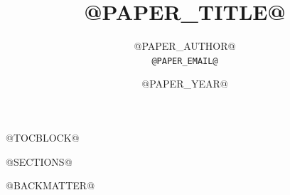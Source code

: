 \documentclass[@PAPER_FONTSIZE@,a4paper]{article}
\title{@PAPER_TITLE@}
\author{%
  @PAPER_AUTHOR@\\
  \small\texttt{@PAPER_EMAIL@}%
}
\date{@PAPER_YEAR@}
\begin{document}
\maketitle


\newpage
@TOCBLOCK@

@SECTIONS@

@BACKMATTER@
\end{document}
